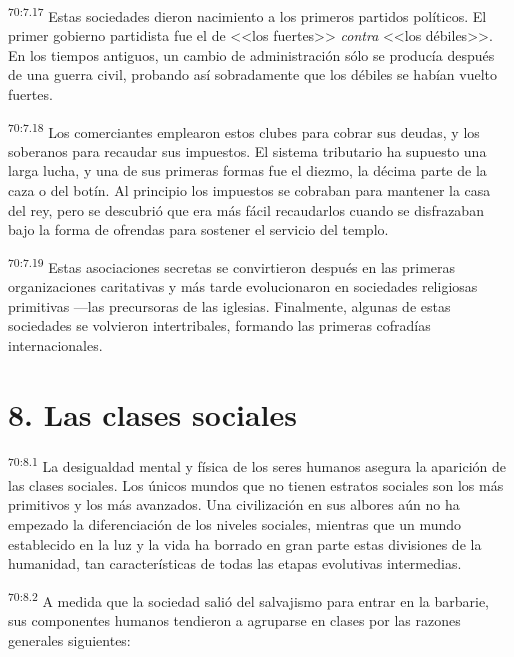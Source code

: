 \documentclass[twoside, 11pt]{book}
\begin{document}
\par
\textsuperscript{70:7.17} Estas sociedades dieron nacimiento a los primeros partidos políticos. El primer gobierno partidista fue el de <<los fuertes>> \textit{contra} <<los débiles>>. En los tiempos antiguos, un cambio de administración sólo se producía después de una guerra civil, probando así sobradamente que los débiles se habían vuelto fuertes.

\par
\textsuperscript{70:7.18} Los comerciantes emplearon estos clubes para cobrar sus deudas, y los soberanos para recaudar sus impuestos. El sistema tributario ha supuesto una larga lucha, y una de sus primeras formas fue el diezmo, la décima parte de la caza o del botín. Al principio los impuestos se cobraban para mantener la casa del rey, pero se descubrió que era más fácil recaudarlos cuando se disfrazaban bajo la forma de ofrendas para sostener el servicio del templo.

\par
\textsuperscript{70:7.19} Estas asociaciones secretas se convirtieron después en las primeras organizaciones caritativas y más tarde evolucionaron en sociedades religiosas primitivas ---las precursoras de las iglesias. Finalmente, algunas de estas sociedades se volvieron intertribales, formando las primeras cofradías internacionales.

\section*{8. Las clases sociales}
\par
\textsuperscript{70:8.1} La desigualdad mental y física de los seres humanos asegura la aparición de las clases sociales. Los únicos mundos que no tienen estratos sociales son los más primitivos y los más avanzados. Una civilización en sus albores aún no ha empezado la diferenciación de los niveles sociales, mientras que un mundo establecido en la luz y la vida ha borrado en gran parte estas divisiones de la humanidad, tan características de todas las etapas evolutivas intermedias.

\par
\textsuperscript{70:8.2} A medida que la sociedad salió del salvajismo para entrar en la barbarie, sus componentes humanos tendieron a agruparse en clases por las razones generales siguientes:
\end{document}
